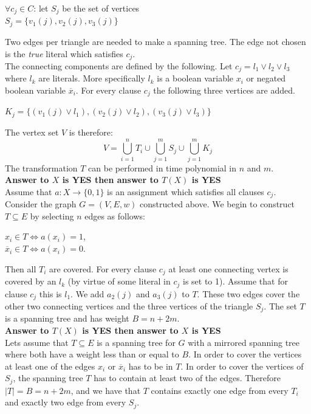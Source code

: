 \documentclass[12pt]{article}
\begin{document}
\begin{center}
$\forall c_j \in C$: let $S_j$ be the set of vertices\\
$S_j  = \{v_1(j),v_2(j),v_3(j)\}$
\end{center}
Two edges per triangle are needed to make a spanning tree. The edge not chosen is the \emph{true} literal which satisfies $c_j$.\\
The connecting components are defined by the following. Let $c_j = l_1 \vee l_2 \vee l_3$ where $l_k$ are literals. More specifically $l_k$ is a boolean variable $x_i$ or negated boolean variable $\overline{x}_i$. For every clause $c_j$ the following three vertices are added.
\begin{center}
$K_j = \{(v_1(j) \vee l_1), (v_2(j) \vee l_2), (v_3(j) \vee l_3)\}$
\end{center}
The vertex set $V$ is therefore:
$$V = \bigcup_{i=1}^{n}{T_i} \cup \bigcup_{j=1}^{m}{S_j} \cup \bigcup_{j=1}^{m}{K_j}$$
The transformation $T$ can be performed in time polynomial in $n$ and $m$.
\\[0.25cm] \textbf{Answer to $X$ is YES then answer to $T(X)$ is YES}\\
Assume that $a: X \rightarrow \{0,1\}$ is an assignment which satisfies all clauses $c_j$. Consider the graph $G = (V,E,w)$ constructed above. We begin to construct $T \subseteq E$ by selecting $n$ edges as follows:
\begin{center}
$x_i \in T \Longleftrightarrow a(x_i) = 1$,\\
$\overline{x}_i \in T \Longleftrightarrow a(x_i) = 0$.
\end{center}
Then all $T_i$ are covered. For every clause $c_j$ at least one connecting vertex is covered by an $l_k$ (by virtue of some literal in $c_j$ is set to 1). Assume that for clause $c_j$ this is $l_1$. We add $a_2(j)$ and $a_3(j)$ to $T$. These two edges cover the other two connecting vertices and the three vertices of the triangle $S_j$. The set $T$ is a spanning tree and has weight $B = n + 2m$.
\\[0.25cm] \textbf{Answer to $T(X)$ is YES then answer to $X$ is YES}\\
Lets assume that $T \subseteq E$ is a spanning tree for $G$ with a mirrored spanning tree where both have a weight less than or equal to $B$. In order to cover the vertices at least one of the edges $x_i$ or $\overline{x}_i$ has to be in $T$. In order to cover the vertices of $S_j$, the spanning tree $T$ has to contain at least two of the edges. Therefore $|T| = B = n + 2m$, and we have that $T$ contains exactly one edge from every $T_i$ and exactly two edge from every $S_j$.\\
\end{document}
